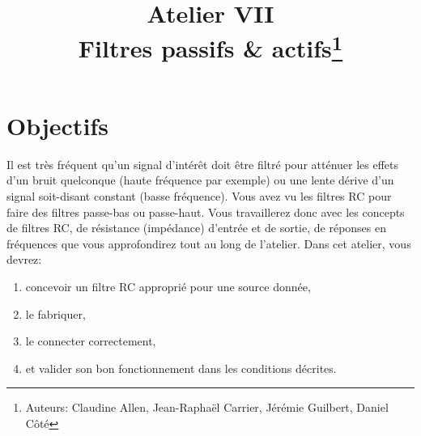 \documentclass[canadien,12pt,oneside,letterpaper]{article}
\title{\textbf{Atelier VII}\\Filtres passifs \& actifs\thanks{Auteurs: Claudine Allen, Jean-Raphaël Carrier, Jérémie Guilbert, Daniel Côté}}
\date{}
\begin{document}
\maketitle \vspace{-2cm}

\section{Objectifs}

Il est très fréquent qu'un signal d'intérêt doit être filtré pour atténuer les effets d'un bruit quelconque (haute fréquence par exemple) ou une lente dérive d'un signal soit-disant constant (basse fréquence). Vous avez vu les filtres RC pour faire des filtres passe-bas ou passe-haut.  Vous travaillerez donc avec les concepts de filtres RC, de résistance (impédance) d'entrée et de sortie, de réponses en fréquences que vous approfondirez tout au long de l'atelier. Dans cet atelier, vous devrez:
\begin{enumerate}
\item concevoir un filtre RC approprié pour une source donnée, 
\item le fabriquer, 
\item le connecter correctement,
\item et valider son bon fonctionnement dans les conditions décrites. 
\end{enumerate}
 
\end{document}

